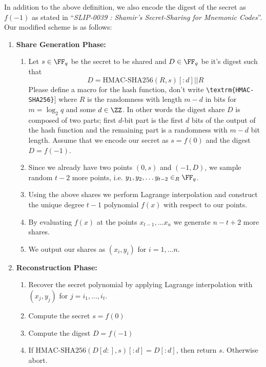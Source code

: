 \documentclass[envcountsame,runningheads,notitlepage]{llncs}
\DeclareRobustCommand{\michals}[2] {{\color{magenta}{$\big[$\scriptsize\textsf{Michal #1:}} #2$\big]$}}
\begin{document}
	In addition to the above definition, we also encode the digest of the secret as $f(-1)$ as stated in ``\textit{SLIP-0039 : Shamir's Secret-Sharing for Mnemonic Codes}''. Our modified scheme is as follows:
	\begin{enumerate}
		\item \textbf{Share Generation Phase:}  
			\begin{enumerate}
				\item Let $s \in \FF_q$ be the secret to be shared and $D \in \FF_q$ be it's digest such that 
				\begin{equation*}
				D = \textrm{HMAC-SHA256}(R,s)[:d] || R
				\end{equation*} 
				\michals{13.03}{Please define a macro for the hash function, don't write \texttt{\textbackslash textrm\{HMAC-SHA256\}}}
				where $R$ is the randomness with length $m - d$ in bits for $m = \log_{2}{q}$ and some $d \in \ZZ$. In other words the digest share $D$ is composed of two parts; first $d$-bit part is the first $d$ bits of the output of the hash function and the remaining part is a randomness with $m - d$ bit length. Assume that we encode our secret as $s = f(0)$ and the digest $D = f(-1)$.
				\item Since we already have two points $(0, s)$ and $(-1, D)$, we sample random $t-2$ more points, i.e. $y_{1}, y_{2}, \ldots y_{t-2} \in_{R} \FF_q$.
				\item Using the above shares we perform Lagrange interpolation and construct the unique degree $t - 1$ polynomial $f (x)$ with respect to our points.  
				\item By evaluating $f (x)$ at the points $x_{t - 1}, \ldots x_{n}$ we generate $n - t + 2$ more shares.
				\item We output our shares as $(x_{i},y_{i})$ for $i = 1, \ldots n$.
			\end{enumerate}
		\item \textbf{Reconstruction Phase:}  
			\begin{enumerate}
				\item Recover the secret polynomial by applying Lagrange interpolation with $(x_{j}, y_{j})$ for $j = i_{1}, \ldots, i_{t}$.
				\item Compute the secret $s = f(0)$
				\item Compute the digest $D = f(-1)$
				\item If $\textrm{HMAC-SHA256}(D[d:],s)[:d] = D[:d]$, then return $s$. Otherwise abort. 
			\end{enumerate}
	\end{enumerate}
	
\end{document}
